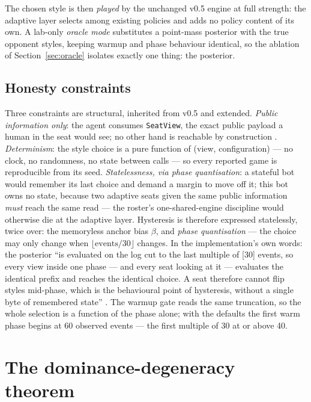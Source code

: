 \documentclass[11pt]{article}
\newcommand{\code}[1]{\texttt{#1}}
\begin{document}
The chosen style is then \emph{played} by the unchanged v0.5 engine at full strength: the
adaptive layer selects among existing policies and adds no policy content of its own. A
lab-only \emph{oracle mode} substitutes a point-mass posterior with the true opponent
styles, keeping warmup and phase behaviour identical, so the ablation of
Section~\ref{sec:oracle} isolates exactly one thing: the posterior.

\subsection{Honesty constraints}
\label{sec:honesty}

Three constraints are structural, inherited from v0.5 and extended. \emph{Public
information only}: the agent consumes \code{SeatView}, the exact public payload a human in
the seat would see; no other hand is reachable by construction \cite{v05paper,repo}.
\emph{Determinism}: the style choice is a pure function of (view, configuration) --- no
clock, no randomness, no state between calls --- so every reported game is reproducible
from its seed. \emph{Statelessness, via phase quantisation}: a stateful bot would remember
its last choice and demand a margin to move off it; this bot owns no state, because two
adaptive seats given the same public information \emph{must} reach the same read --- the
roster's one-shared-engine discipline \cite{styles} would otherwise die at the adaptive
layer. Hysteresis is therefore expressed statelessly, twice over: the memoryless anchor
bias $\beta$, and \emph{phase quantisation} --- the choice may only change when
$\lfloor \text{events}/30 \rfloor$ changes. In the implementation's own words: the
posterior ``is evaluated on the log cut to the last multiple of [30] events, so every view
inside one phase --- and every seat looking at it --- evaluates the identical prefix and
reaches the identical choice. A seat therefore cannot flip styles mid-phase, which is the
behavioural point of hysteresis, without a single byte of remembered state'' \cite{repo}.
The warmup gate reads the same truncation, so the whole selection is a function of the
phase alone; with the defaults the first warm phase begins at 60 observed events --- the
first multiple of 30 at or above 40.

\section{The dominance-degeneracy theorem}
\label{sec:theorem}
\end{document}
